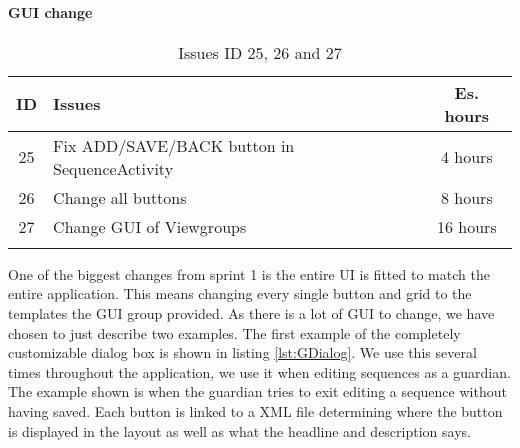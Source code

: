 \paragraph{GUI change} \label{para:spr2_resolved_issues_GUI_change}


\begin{longtable} { | c | p{12cm} | c | } 
\hline
	ID 	&	Issues	&		 Es. hours \\\hline
	25	& 	Fix ADD/SAVE/BACK button in SequenceActivity	&	4 hours	\\\hline
	26	& 	Change all buttons	&	8 hours	\\\hline
	27	& 	Change GUI of Viewgroups	&	16 hours	\\\hline
\caption{Issues ID 25, 26 and 27}
\label{tab:spr2_GUIchange}
\end{longtable}

One of the biggest changes from sprint 1 is the entire UI is fitted to match the entire application. This means changing every single button and grid to the templates the GUI group provided. As there is a lot of GUI to change, we have chosen to just describe two examples. The first example of the completely customizable dialog box is shown in listing \ref{lst:GDialog}. We use this several times throughout the application, we use it when editing sequences as a guardian. The example shown is when the guardian tries to exit editing a sequence without having saved. Each button is linked to a XML file determining where the button is displayed in the layout as well as what the headline and description says.

